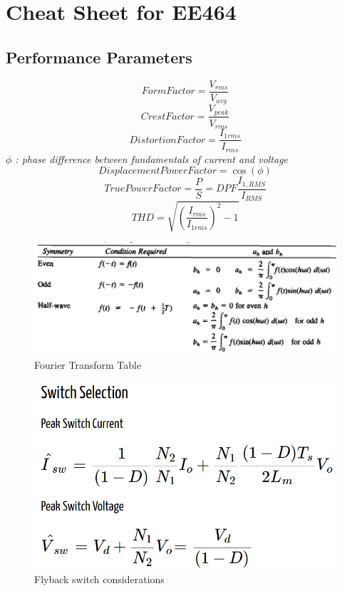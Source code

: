 \documentclass[twocolumn, ]{article}
\begin{document}
\section*{\small Cheat Sheet for EE464}

\subsection*{\small Performance Parameters}
\begin{equation*}
Form Factor=\frac{V_{rms}}{V_{avg}}
\end{equation*}
\begin{equation*}
Crest Factor=\frac{V_{peak}}{V_{rms}}
\end{equation*}
\begin{equation*}
Distortion Factor=\frac{I_{1rms}}{I_{rms}}
\end{equation*}
\textit{$\phi$ : phase difference between fundamentals of current and voltage}
\begin{equation*}
Displacement Power Factor=\cos(\phi)
\end{equation*}
\begin{equation*}
True Power Factor=\frac{P}{S}=DPF \frac{I_{1,RMS}}{I_{RMS}}
\end{equation*}
\begin{equation*}
THD=\sqrt{(\frac{I_{rms}}{I_{1rms}})^2-1}
\end{equation*}



  \begin{figure}[!ht]
	\includegraphics[scale=0.30]{Fourier.png}
	\caption{Fourier Transform Table}
\end{figure}


  \begin{figure}[!ht]
	\includegraphics[scale=0.30]{flybak_switch}
	\caption{Flyback switch considerations}
\end{figure}
\end{document}
